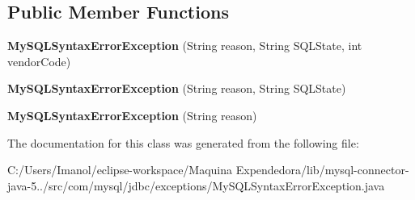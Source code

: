\subsection*{Public Member Functions}
\begin{DoxyCompactItemize}
\item 
\mbox{\label{classcom_1_1mysql_1_1jdbc_1_1exceptions_1_1_my_s_q_l_syntax_error_exception_a0d79beb12c406e8dd5efe917f7f547c5}} 
{\bfseries My\+S\+Q\+L\+Syntax\+Error\+Exception} (String reason, String S\+Q\+L\+State, int vendor\+Code)
\item 
\mbox{\label{classcom_1_1mysql_1_1jdbc_1_1exceptions_1_1_my_s_q_l_syntax_error_exception_ac3a0c737d1a5ed990922ca348feaf1f7}} 
{\bfseries My\+S\+Q\+L\+Syntax\+Error\+Exception} (String reason, String S\+Q\+L\+State)
\item 
\mbox{\label{classcom_1_1mysql_1_1jdbc_1_1exceptions_1_1_my_s_q_l_syntax_error_exception_a5b643ee7641003ed70662c77292bbd83}} 
{\bfseries My\+S\+Q\+L\+Syntax\+Error\+Exception} (String reason)
\end{DoxyCompactItemize}


The documentation for this class was generated from the following file\+:\begin{DoxyCompactItemize}
\item 
C\+:/\+Users/\+Imanol/eclipse-\/workspace/\+Maquina Expendedora/lib/mysql-\/connector-\/java-\/5../src/com/mysql/jdbc/exceptions/My\+S\+Q\+L\+Syntax\+Error\+Exception.\+java\end{DoxyCompactItemize}
